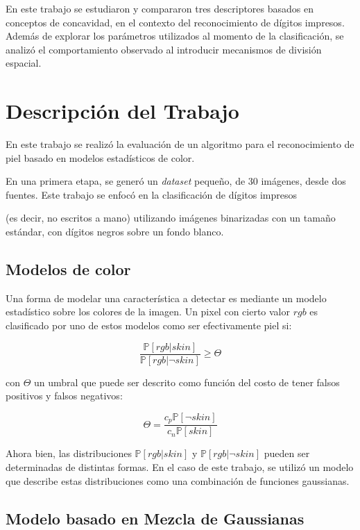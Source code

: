 \documentclass[12pt]{article}
\begin{document}
En este trabajo se estudiaron y compararon tres descriptores basados en
conceptos de concavidad, en el contexto del reconocimiento de dígitos impresos.
Además de explorar los parámetros utilizados al momento de la clasificación, se
analizó el comportamiento observado al introducir mecanismos de división
espacial. 

\section{Descripción del Trabajo}

En este trabajo se realizó la evaluación de un algoritmo para el reconocimiento
de piel basado en modelos estadísticos de color. 

En una primera etapa, se generó un \emph{dataset}
pequeño, de 30 imágenes, desde dos fuentes. 
Este trabajo se enfocó en la clasificación de dígitos impresos

(es decir, no
escritos a mano) utilizando imágenes binarizadas con un tamaño estándar, con
dígitos negros sobre un fondo blanco.

\subsection{Modelos de color}

Una forma de modelar una característica a detectar es mediante un modelo
estadístico sobre los colores de la imagen. Un pixel con cierto valor $rgb$ es
clasificado por uno de estos modelos como ser efectivamente piel si:

\begin{equation}
    \frac{ \mathbb{P} [ rgb|skin ] }{ \mathbb{P} [ rgb | \neg skin ] } \geq
    \Theta
\end{equation}

con $\Theta$ un umbral que puede ser descrito como función del costo de tener
falsos positivos y falsos negativos:

\begin{equation}
    \Theta = \frac{c_p \mathbb{P} [\neg skin]}{c_n \mathbb{P}[skin]}
\end{equation}

Ahora bien, las distribuciones $\mathbb{P} [ rgb|skin ]$ y $\mathbb{P} [ rgb | \neg
skin ]$ pueden ser determinadas de distintas formas. En el caso de este trabajo, se
utilizó un modelo que describe estas distribuciones como una combinación de
funciones gaussianas.

\subsection{Modelo basado en Mezcla de Gaussianas}
\end{document}
